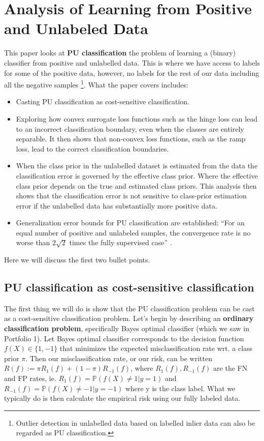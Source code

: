 \section{Analysis of Learning from Positive and Unlabeled Data}
This paper looks at \textbf{PU classification} the problem of learning a (binary) classifier from positive and unlabelled data. This is where we have access to labels for some of the positive data, however, no labels for the rest of our data including all the negative samples \footnote{Outlier detection in unlabelled data based on labelled inlier data can also be regarded as PU classification.}. What the paper \cite{du2014analysis} covers includes:
\begin{itemize}
    \item Casting PU classification as cost-sensitive classification.
    \item Exploring how convex surrogate loss functions such as the hinge loss can lead to an incorrect classification boundary, even when the classes are entirely separable. It then shows that non-convex loss functions, such as the ramp loss, lead to the correct classification boundaries.  
    \item When the class prior in the unlabelled dataset is estimated from the data the classification error is governed by the effective class prior. Where the effective class prior depends on the true and estimated class priors. This analysis then shows that the classification error is not sensitive to class-prior estimation error if the unlabelled data has substantially more positive data. 
    \item Generalization error bounds for PU classification are established: ``For an equal number of positive and unlabeled samples, the convergence rate is no worse than $2 \sqrt{2}$ times the fully supervised case'' \cite{du2014analysis}.
\end{itemize}
Here we will discuss the first two bullet points.

\subsection*{PU classification as cost-sensitive classification}
The first thing we will do is show that the PU classification problem can be cast as a cost-sensitive classification problem. Let's begin by describing an \textbf{ordinary classification problem}, specifically Bayes optimal classifier (which we saw in Portfolio 1). Let Bayes optimal classifier corresponds to the decision function $f(X) \in \{1,-1\}$ that minimizes the expected misclassification rate wrt. a class prior $\pi$. Then our misclassification rate, or our risk, can be written $R(f) := \pi R_{1}(f) +(1- \pi) R_{-1}(f)$, where $R_{1}(f), R_{-1}(f)$ are the FN and FP rates, ie. $R_{1}(f) = \mathbb{P}(f(X) \neq 1 | y=1)$ and $R_{-1}(f) = \mathbb{P}(f(X) \neq -1 | y=-1)$ where y is the class label. What we typically do is then calculate the empirical risk using our fully labeled data. 

